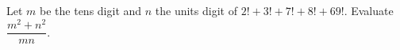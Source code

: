 Let $m$ be the tens digit and $n$ the units digit of $2!+3!+7!+8!+69!$. Evaluate $\dfrac{m^2+n^2}{mn}$.
